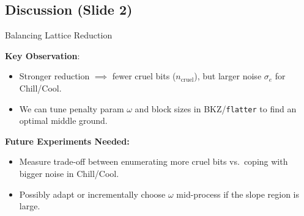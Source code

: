\documentclass{beamer}
\begin{document}
\subsection*{Discussion (Slide 2)}
\begin{frame}{Balancing Lattice Reduction}

\textbf{Key Observation}:
\begin{itemize}
  \item Stronger reduction $\implies$ fewer cruel bits ($n_{\mathrm{cruel}}$), 
        but larger noise $\sigma_e$ for Chill/Cool.
  \item We can tune penalty param $\omega$ and block sizes in BKZ/\texttt{flatter}
        to find an optimal middle ground.
\end{itemize}

\textbf{Future Experiments Needed:}
\begin{itemize}
  \item Measure trade-off between enumerating more cruel bits vs.\ coping 
        with bigger noise in Chill/Cool.
  \item Possibly adapt or incrementally choose $\omega$ mid-process
        if the slope region is large.
\end{itemize}
\end{frame}
\end{document}
